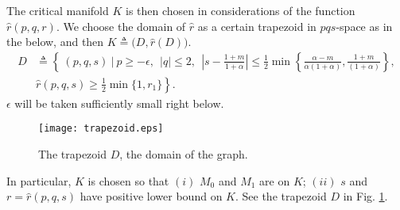\documentclass[a4paper,11pt]{article}
\theoremstyle{remark}
\begin{document}
The critical manifold $K$ is then chosen in considerations of the function $\hat{r}(p,q,r)$. We choose the domain of $\hat{r}$ as a certain trapezoid in $pqs$-space as in the below, and then $K\triangleq\big(D,\hat{r}(D)\big)$.
\begin{align*}
 D &\triangleq \left\{ \: (p,q,s) \: \Big| \:  p\ge-\epsilon, ~~ |q|\le2, ~~ \left|s-\frac{1+m}{1+\alpha}\right| \le \frac{1}{2}\min\left\{\frac{\alpha-m}{\alpha(1+\alpha)},\frac{1+m}{(1+\alpha)}\right\},\right.  \\
 &\left. \hat{r}(p,q,s)\ge \frac{1}{2}\min\{1,r_1\}\right\}.
\end{align*}
$\epsilon$ will be taken sufficiently small right below.
\begin{figure}[ht]
 \centering
  \texttt{[image: trapezoid.eps]}
  \caption{The trapezoid $D$, the domain of the graph.} \label{fig:D}
\end{figure}
In particular, $K$ is chosen so that $(i)$ $M_0$ and $M_1$ are on $K$; $(ii)$ $s$ and $r=\hat{r}(p,q,s)$ have positive lower bound on $K$. See the trapezoid $D$ in Fig. \ref{fig:D}. 
\end{document}
